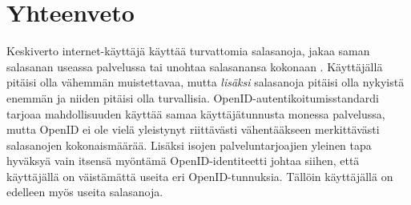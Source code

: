 \documentclass{tktltiki}
\begin{document}
  


     

\section{Yhteenveto}

Keskiverto internet-käyttäjä käyttää turvattomia salasanoja, jakaa saman salasanan useassa palvelussa tai unohtaa salasanansa kokonaan \cite{study_of_passwords_07, password_management_strategies_06, generating_and_remembering_pws_04, users_are_not_the_enemy_99}. Käyttäjällä pitäisi olla vähemmän muistettavaa, mutta \emph{lisäksi} salasanoja pitäisi olla nykyistä enemmän ja niiden pitäisi olla turvallisia. 
OpenID-autentikoitumisstandardi tarjoaa mahdollisuuden käyttää samaa käyttäjätunnusta monessa palvelussa, mutta OpenID ei ole vielä yleistynyt riittävästi vähentääkseen merkittävästi salasanojen kokonaismäärää. Lisäksi isojen palveluntarjoajien yleinen tapa hyväksyä vain itsensä myöntämä OpenID-identiteetti johtaa siihen, että käyttäjällä on väistämättä useita eri OpenID-tunnuksia. Tällöin käyttäjällä on edelleen myös useita salasanoja.
\end{document}
